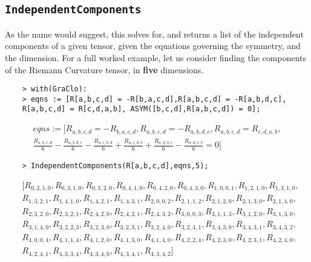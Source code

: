 \documentclass{article}
\begin{document}
\subsection*{\verb~IndependentComponents~}

As the name would suggest, this solves for, and returns a list of the independent components of a given tensor, given the equations governing the symmetry, and the dimension. For a full worked example, let us consider finding the components of the Riemann Curvature tensor, in \textbf{five} dimensions.

\begin{verbatim}
    > with(GraClo):
    > eqns := [R[a,b,c,d] = -R[b,a,c,d],R[a,b,c,d] = -R[a,b,d,c],
    R[a,b,c,d] = R[c,d,a,b], ASYM([b,c,d],R[a,b,c,d]) = 0];
\end{verbatim}
\begin{equation*}
\begin{split}
   eqns :=  [R_{{a,b,c,d}}=-R_{{b,a,c,d}},R_{{a,b,c,d}}=-R_{{a,b,d,c}},R_{{a,b,c,d
}}=R_{{c,d,a,b}}, \\ {\frac {R_{{a,b,c,d}}}{6}}-{\frac {R_{{a,b,d,c}}}{6}}
-{\frac {R_{{a,c,b,d}}}{6}}+{\frac {R_{{a,c,d,b}}}{6}}+{\frac {R_{{a,d
,b,c}}}{6}}-{\frac {R_{{a,d,c,b}}}{6}}=0]
\end{split}
\end{equation*}
\begin{verbatim}
    > IndependentComponents(R[a,b,c,d],eqns,5);
\end{verbatim}
\begin{equation*}
    \begin{split}
& [R_{{0,2,1,0}},R_{{0,3,1,0}},R_{{0,3,2,0}},R_{{0,4,1,0}},R_{{0,4,2,0}}
,R_{{0,4,3,0}},R_{{1,0,0,1}},R_{{1,2,1,0}},R_{{1,3,1,0}}, \\  & R_{{1,3,2,1}}
,R_{{1,4,1,0}},R_{{1,4,2,1}},R_{{1,4,3,1}},R_{{2,0,0,2}},R_{{2,1,1,2}}
,R_{{2,1,2,0}},R_{{2,1,3,0}},R_{{2,1,4,0}}, \\ & R_{{2,3,2,0}},R_{{2,3,2,1}}
,R_{{2,4,2,0}},R_{{2,4,2,1}},R_{{2,4,3,2}},R_{{3,0,0,3}},R_{{3,1,1,3}}
,R_{{3,1,2,0}},R_{{3,1,3,0}}, \\ & R_{{3,1,4,0}},R_{{3,2,2,3}},R_{{3,2,3,0}}
,R_{{3,2,3,1}},R_{{3,2,4,0}},R_{{3,2,4,1}},R_{{3,4,3,0}},R_{{3,4,3,1}}
,R_{{3,4,3,2}}, \\ & R_{{4,0,0,4}},R_{{4,1,1,4}},R_{{4,1,2,0}},R_{{4,1,3,0}}
,R_{{4,1,4,0}},R_{{4,2,2,4}},R_{{4,2,3,0}},R_{{4,2,3,1}},R_{{4,2,4,0}}, \\ & 
R_{{4,2,4,1}},R_{{4,3,3,4}},R_{{4,3,4,0}},R_{{4,3,4,1}},R_{{4,3,4,2}}
]
\end{split}
\end{equation*}
\end{document}
